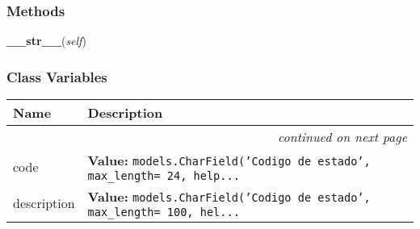   \subsubsection{Methods}

    \label{GroundSegment:models:SatelliteState:SatelliteState:__str__}

    \vspace{0.5ex}

\hspace{.8\funcindent}\begin{boxedminipage}{\funcwidth}

    \raggedright \textbf{\_\_str\_\_}(\textit{self})

\setlength{\parskip}{2ex}
\setlength{\parskip}{1ex}
    \end{boxedminipage}



  \subsubsection{Class Variables}

    \vspace{-1cm}
\hspace{\varindent}\begin{longtable}{|p{\varnamewidth}|p{\vardescrwidth}|l}
\cline{1-2}
\cline{1-2} \centering \textbf{Name} & \centering \textbf{Description}& \\
\cline{1-2}
\endhead\cline{1-2}\multicolumn{3}{r}{\small\textit{continued on next page}}\\\endfoot\cline{1-2}
\endlastfoot\raggedright c\-o\-d\-e\- & \raggedright \textbf{Value:} 
{\tt models.CharField('Codigo de estado', max\_length= 24, help\texttt{...}}&\\
\cline{1-2}
\raggedright d\-e\-s\-c\-r\-i\-p\-t\-i\-o\-n\- & \raggedright \textbf{Value:} 
{\tt models.CharField('Codigo de estado', max\_length= 100, hel\texttt{...}}&\\
\cline{1-2}
\end{longtable}

